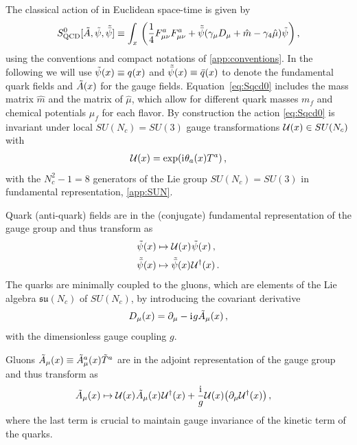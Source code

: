 The classical action of \qcd{} in Euclidean space-time is given by
\begin{align}
S_\mathrm{QCD}^0[\tilde{A},\tilde{\psi},\tilde{\bar{\psi}}]\equiv \int_x\, \bigg(
\frac{1}{4} F_{\mu\nu}^a F_{\mu\nu}^a
+\tilde{\bar{\psi}}(\gamma_\mu D_\mu +\hat{m}- \gamma_4 \hat{\mu})\tilde{\psi}
\bigg )\, ,
\label{eq:Sqcd0}
\end{align}
using the conventions and compact notations of \cref{app:conventions}.
In the following we will use ${\tilde{\psi}(x)\equiv q(x)}$ and ${\tilde{\bar{\psi}}(x)\equiv \bar{q}(x)}$ to denote the fundamental quark fields and $\tilde{A}(x)$ for the gauge fields.
Equation~\eqref{eq:Sqcd0} includes the mass matrix $\hat{m}$ and the matrix of $\hat{\mu}$, which allow for different quark masses $m_f$ and chemical potentials $\mu_f$ for each flavor.
By construction the action \eqref{eq:Sqcd0} is invariant under local $SU(N_c)=SU(3)$ gauge transformations $\mathcal{U}{}(x)\in SU(N_c)$ with
\begin{align}
	\mathcal{U}{}(x)=\exp(\mathrm{i}\mkern1mu \theta_a(x)T^{a})\, ,
	\label{eq:Ugauge}
\end{align}
with the $N_c^2-1=8$ generators of the Lie group $SU(N_c)=SU(3)$ in fundamental representation, \cf{} \cref{app:SUN}.

Quark (anti-quark) fields are in the (conjugate) fundamental representation of the gauge group and thus transform as
\begin{subequations}\label{eq:psiUgauge}
\begin{align}
	\tilde{\psi}(x) &\mapsto \mathcal{U}{}(x) \mskip1.0mu{} \tilde{\psi}(x)\, ,\\[0.1em]
	\tilde{\bar{\psi}}(x) &\mapsto  \tilde{\bar{\psi}}(x)\mskip1.0mu{} \mathcal{U}{}^\dagger(x) \, .
\end{align}
\end{subequations}
The quarks are minimally coupled to the gluons, which are elements of the Lie algebra $\mathfrak{su}(N_c)$ of $SU(N_c)$, by introducing the covariant derivative
\begin{align}
D_\mu(x) = \partial_\mu - \mathrm{i}\mkern1mu g \tilde{A}_\mu(x)\, ,
\label{eq:Dgauge}
\end{align}
with the dimensionless gauge coupling $g$.

Gluons  $\tilde{A}_\mu(x)\equiv \tilde{A}_\mu^a(x)\tilde{T}^{a}$ are in the adjoint representation of the gauge group and thus transform as
\begin{align}
\tilde{A}_\mu(x)&\mapsto \mathcal{U}{}(x)\mskip1.0mu{}\tilde{A}_\mu(x)\mskip1.0mu{}\mathcal{U}{}^\dagger (x) + \frac{\mathrm{i}\mkern1mu}{g} \mathcal{U}{}(x)\big(\partial_\mu \mathcal{U}{}^\dagger(x)\big)\,,
\label{eq:AUgauge}
\end{align}
where the last term is crucial to maintain gauge invariance of the kinetic term of the quarks.

